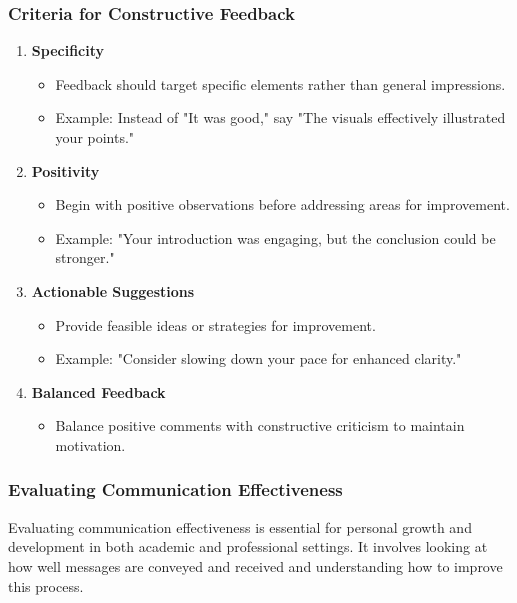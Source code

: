\documentclass[aspectratio=169]{beamer}
\begin{document}
\begin{frame}[fragile]
    \frametitle{Criteria for Constructive Feedback}
    \begin{enumerate}
        \item \textbf{Specificity}
        \begin{itemize}
            \item Feedback should target specific elements rather than general impressions.
            \item Example: Instead of "It was good," say "The visuals effectively illustrated your points."
        \end{itemize}
        
        \item \textbf{Positivity}
        \begin{itemize}
            \item Begin with positive observations before addressing areas for improvement.
            \item Example: "Your introduction was engaging, but the conclusion could be stronger."
        \end{itemize}

        \item \textbf{Actionable Suggestions}
        \begin{itemize}
            \item Provide feasible ideas or strategies for improvement.
            \item Example: "Consider slowing down your pace for enhanced clarity."
        \end{itemize}

        \item \textbf{Balanced Feedback}
        \begin{itemize}
            \item Balance positive comments with constructive criticism to maintain motivation.
        \end{itemize}
    \end{enumerate}
\end{frame}

\begin{frame}[fragile]
    \frametitle{Evaluating Communication Effectiveness}
    Evaluating communication effectiveness is essential for personal growth and development in both academic and professional settings. 
    It involves looking at how well messages are conveyed and received and understanding how to improve this process.
\end{frame}
\end{document}
